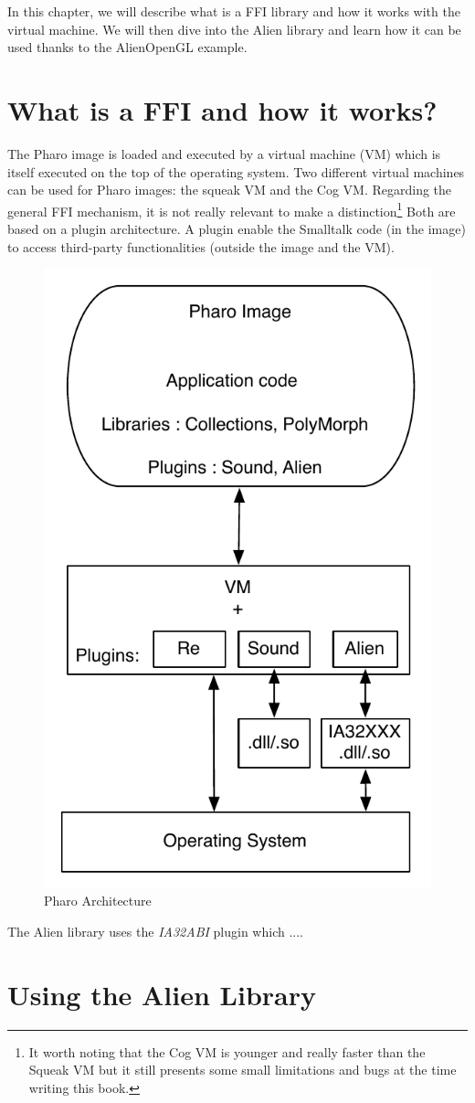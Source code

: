 \documentclass[a4paper,10pt,twoside]{book}
\begin{document}
In this chapter, we will describe what is a FFI library and how it works with the virtual machine. 
We will then dive into the Alien library and learn how it can be used thanks to the AlienOpenGL example.

\section{What is a FFI and how it works?}

The Pharo image is loaded and executed by a virtual machine (VM) which is itself executed on the top of the operating system. 
Two different virtual machines can be used for Pharo images: the squeak VM and the Cog VM.
Regarding the general FFI mechanism, it is not really relevant to make a distinction\footnote{It worth noting that the Cog VM is younger and really faster than the Squeak VM but it still presents some small limitations and bugs at the time writing this book.} 
Both are based on a plugin architecture.
A plugin enable the Smalltalk code (in the image) to access third-party functionalities (outside the image and the VM).

\begin{figure}[htbp]
	\centering
		\includegraphics[width=0.4\linewidth]{figs/plugins.pdf}
	\caption{Pharo Architecture}
	\label{fig:plugins}
\end{figure}

The Alien library uses the \emph{IA32ABI} plugin which ....



\section{Using the Alien Library} \label{sec:the_alien_library} %
\end{document}
